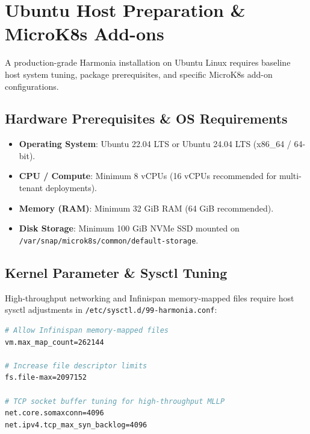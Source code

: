 
\chapter{Ubuntu Host Preparation \& MicroK8s Add-ons}
\label{chap:host_preparation}

A production-grade Harmonia installation on Ubuntu Linux requires baseline host system tuning, package prerequisites, and specific MicroK8s add-on configurations.

\section{Hardware Prerequisites \& OS Requirements}

\begin{itemize}
    \item \textbf{Operating System}: Ubuntu 22.04 LTS or Ubuntu 24.04 LTS (x86\_64 / 64-bit).
    \item \textbf{CPU / Compute}: Minimum 8 vCPUs (16 vCPUs recommended for multi-tenant deployments).
    \item \textbf{Memory (RAM)}: Minimum 32 GiB RAM (64 GiB recommended).
    \item \textbf{Disk Storage}: Minimum 100 GiB NVMe SSD mounted on \nolinkurl{/var/snap/microk8s/common/default-storage}.
\end{itemize}

\section{Kernel Parameter \& Sysctl Tuning}

High-throughput networking and Infinispan memory-mapped files require host sysctl adjustments in \texttt{/etc/sysctl.d/99-harmonia.conf}:
\begin{lstlisting}[language=bash, caption={Harmonia Host Kernel Tuning Parameters}]
# Allow Infinispan memory-mapped files
vm.max_map_count=262144

# Increase file descriptor limits
fs.file-max=2097152

# TCP socket buffer tuning for high-throughput MLLP
net.core.somaxconn=4096
net.ipv4.tcp_max_syn_backlog=4096
\end{lstlisting}

